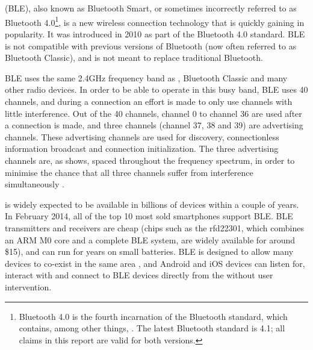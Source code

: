 \section{\BLE}
\BLE (BLE), also known as Bluetooth Smart, or sometimes incorrectly referred to as Bluetooth 4.0\footnote{Bluetooth 4.0 is the fourth incarnation of the Bluetooth standard, which contains, among other things, \BLE. The latest Bluetooth standard is 4.1; all claims in this report are valid for both versions.}, is a new wireless connection technology that is quickly gaining in popularity.
It was introduced in 2010 as part of the Bluetooth 4.0 standard.
BLE is not compatible with previous versions of Bluetooth (now often referred to as Bluetooth Classic), and is not meant to replace traditional Bluetooth.


BLE uses the same 2.4GHz frequency band as \wifi, Bluetooth Classic and many other radio devices.
In order to be able to operate in this busy band, BLE uses 40 channels, and during a connection an effort is made to only use channels with little interference.
Out of the 40 channels, channel 0 to channel 36 are used after a connection is made, and three channels (channel 37, 38 and 39) are advertising channels.
These advertising channels are used for discovery, connectionless information broadcast and connection initialization.
The three advertising channels are, as  shows, spaced throughout the frequency spectrum, in order to minimise the chance that all three channels suffer from interference simultaneously \citep{heydon2013bluetooth}.


\BLE is widely expected to be available in billions of devices within a couple of years.
In February 2014, all of the top 10 most sold smartphones support BLE.
BLE transmitters and receivers are cheap (chips such as the rfd22301, which combines an ARM M0 core and a complete BLE system, are widely available for around \$15), and can run for years on small batteries.
BLE is designed to allow many devices to co-exist in the same area \citep{heydon2013bluetooth}, and Android and iOS devices can listen for, interact with and connect to BLE devices directly from the \app without user intervention.

